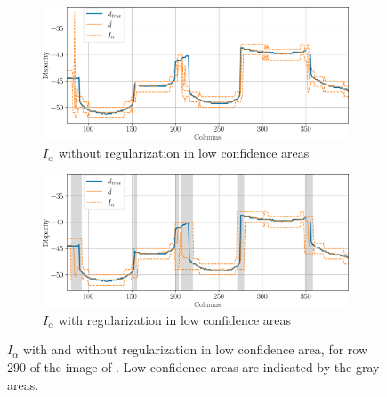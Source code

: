 \begin{figure}
    \centering
    \begin{subfigure}[t]{\linewidth}
        \centering
        \includegraphics[width=\linewidth]{Images/Chap_5/intervals_ambiguous_area_row_290_1.png}
        \caption{$I_\alpha$ without regularization in low confidence areas}
        \label{fig:intervals_ambiguous_row_290_1}
    \end{subfigure}\hfill
    \begin{subfigure}[t]{\linewidth}
        \centering
        \includegraphics[width=\linewidth]{Images/Chap_5/intervals_ambiguous_area_row_290_2.png}
        \caption{$I_\alpha$ with regularization in low confidence areas}
        \label{fig:intervals_ambiguous_row_290_2}
    \end{subfigure}
    \caption{$I_\alpha$ with and without regularization in low confidence area, for row $290$ of the image of . Low confidence areas are indicated by the gray areas.}
    \label{fig:intervals_ambiguous_row_290}
\end{figure}

